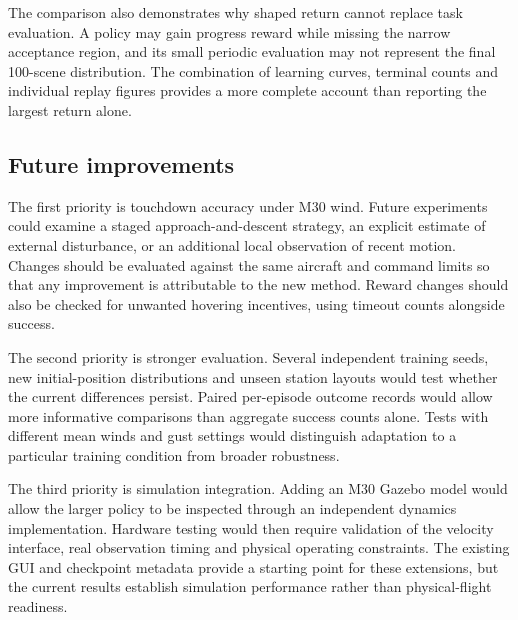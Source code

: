 The comparison also demonstrates why shaped return cannot replace task evaluation. A policy may gain progress reward while missing the narrow acceptance region, and its small periodic evaluation may not represent the final 100-scene distribution. The combination of learning curves, terminal counts and individual replay figures provides a more complete account than reporting the largest return alone.

\hypertarget{future-improvements}{%
\subsection{Future improvements}\label{future-improvements}}

The first priority is touchdown accuracy under M30 wind. Future experiments could examine a staged approach-and-descent strategy, an explicit estimate of external disturbance, or an additional local observation of recent motion. Changes should be evaluated against the same aircraft and command limits so that any improvement is attributable to the new method. Reward changes should also be checked for unwanted hovering incentives, using timeout counts alongside success.

The second priority is stronger evaluation. Several independent training seeds, new initial-position distributions and unseen station layouts would test whether the current differences persist. Paired per-episode outcome records would allow more informative comparisons than aggregate success counts alone. Tests with different mean winds and gust settings would distinguish adaptation to a particular training condition from broader robustness.

The third priority is simulation integration. Adding an M30 Gazebo model would allow the larger policy to be inspected through an independent dynamics implementation. Hardware testing would then require validation of the velocity interface, real observation timing and physical operating constraints. The existing GUI and checkpoint metadata provide a starting point for these extensions, but the current results establish simulation performance rather than physical-flight readiness.
